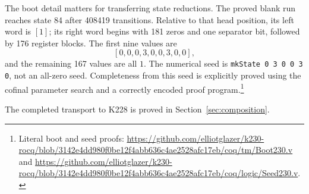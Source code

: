 The boot detail matters for transferring state reductions.  The proved
blank run reaches state 84 after 408419 transitions.  Relative to that
head position, its left word is $[1]$; its right word begins with 181
zeros and one separator bit, followed by 176 register blocks.  The first
nine values are
\[
                       [0,0,0,3,0,0,3,0,0],
\]
and the remaining 167 values are all $1$.  The numerical seed is
\texttt{mkState 0 3 0 0 3 0}, not an all-zero seed.  Completeness from
this seed is explicitly proved using the cofinal parameter search and
a correctly encoded proof program.\footnote{Literal boot and seed proofs:
\url{https://github.com/elliotglazer/k230-rocq/blob/3142e4dd980f0be12f4abb636c4ae2528afc17eb/coq/tm/Boot230.v}
and
\url{https://github.com/elliotglazer/k230-rocq/blob/3142e4dd980f0be12f4abb636c4ae2528afc17eb/coq/logic/Seed230.v}.}


The completed transport to K228 is proved in Section~\ref{sec:composition}.

